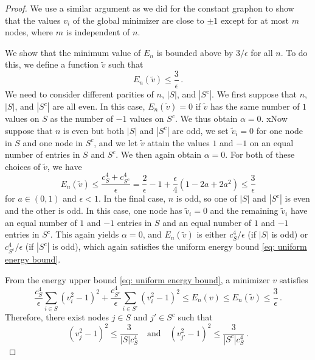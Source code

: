 \documentclass[11pt]{amsart}
\def\ep{\epsilon}
\numberwithin{equation}{section}
\begin{document}
{\begin{proof}

We use a similar argument as we did for the constant graphon to show that the values $v_i$ of the global minimizer are close to $\pm 1$ except for at most $m$ {nodes,} where $m$ is independent of $n$.

We show that the minimum value of $E_n$ is bounded above by $3/\ep$ for all $n$. To do this, we define
a function $\tilde{v}$ such that 
\begin{equation}\label{eq: uniform energy bound}
    E_n(\tilde{v}) \leq \frac{3}{\ep} \,.
\end{equation}
We need to consider different parities of $n$, $|S|$, and $|S^c|$.
We first suppose that $n$, $|S|$, and $|S^c|$ are all even.
In this case, $E_n(\tilde{v}) =  0$ if $\tilde{v}$ has the same number of $1$ values on $S$ as the number of $-1$ values on $S^c$. We thus obtain $\alpha = 0$. xNow suppose that $n$ is even but both $|S|$ and $|S^c|$ are odd, we set $\tilde{v}_i = 0$ for one node in $S$ and one node in $S^c$, and we {let $\tilde{v}$ attain the values $1$ and $-1$ on an equal number of entries} in $S$ {and} $S^c$. {We then again obtain} $\alpha = 0$. For both of these choices of $\tilde{v}$, we have 
\begin{equation}\label{Eq: E_n bound}
    E_n(\tilde{v}) \leq \frac{c_S^4 + c_{S^c}^4}{\ep} = \frac{2}{\ep} - 1 + \frac{\ep}{4}(1 - 2a + 2a^2) \leq \frac{3}{\ep} 
\end{equation}
for $a\in (0,1)$ and $\ep < 1$. 
{In} the final case, $n$ is odd, so one of $|S|$ and $|S^c|$ is even and the other is odd. In this case, one node has $\tilde{v}_i = 0$ and the remaining $\tilde{v}_i$ have an equal number of $1$ and $-1$ entries in $S$ and an equal number of $1$ and $-1$ entries in $S^c$. This again yields $\alpha = 0$, and $E_n(\tilde{v})$ is either {${c_S^4}/{\ep}$} (if $|S|$ is odd) or {${c_{S^c}^4}/{\ep}$} (if $|S^c|$ is odd), which again satisfies the uniform energy bound \eqref{eq: uniform energy bound}.

From the energy upper bound \eqref{eq: uniform energy bound}, a minimizer $v$ satisfies
\begin{equation}
\label{Eq: Energy-min}
     \frac{c_S^4}{\ep} \sum_{i\in S} (v_i^2 - 1)^2
    + \frac{c_{S^c}^4}{\ep} \sum_{i\in S^c} (v_i^2 - 1)^2 \leq E_n(v)\leq E_n(\tilde{v}) \leq \frac{3}{\ep} \,.
\end{equation}
Therefore, there exist nodes $j\in S$
and $j'\in S^c$ such that 
\begin{equation}
    (v_j^2 - 1)^2 \leq \frac{3}{|S|c^4_S} \quad \text{and} \quad (v_{j'}^2 - 1)^2 \leq \frac{3}{|S^c|c^4_S}\,.
\end{equation}


\end{proof}}
\end{document}
